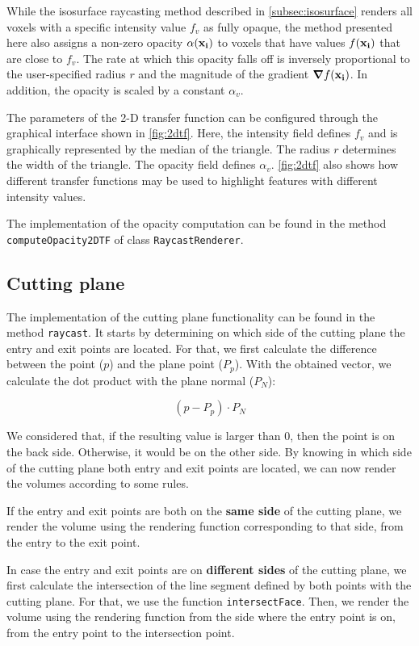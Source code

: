 \documentclass[a4paper]{article}
\begin{document}
While the isosurface raycasting method described in \autoref{subsec:isosurface} renders all voxels with a specific intensity value $f_v$ as fully opaque, the method presented here also assigns a non-zero opacity $\alpha(\vb{x_i})$ to voxels that have values $f(\vb{x_i})$ that are close to $f_v$. The rate at which this opacity falls off is inversely proportional to the user-specified radius $r$ and the magnitude of the gradient $\grad f(\vb{x_i})$. In addition, the opacity is scaled by a constant $\alpha_v$.

The parameters of the 2-D transfer function can be configured through the graphical interface shown in \autoref{fig:2dtf}. Here, the intensity field defines $f_v$ and is graphically represented by the median of the triangle. The radius $r$ determines the width of the triangle. The opacity field defines $\alpha_v$. \autoref{fig:2dtf} also shows how different transfer functions may be used to highlight features with different intensity values.

The implementation of the opacity computation can be found in the method {\tt computeOpacity2DTF} of class {\tt RaycastRenderer}.

\subsection{Cutting plane}

The implementation of the cutting plane functionality can be found in the method {\tt raycast}. It starts by determining on which side of the cutting plane the entry and exit points are located. For that, we first calculate the difference between the point ($p$) and the plane point ($P_p$). With the obtained vector, we calculate the dot product with the plane normal ($P_N$):

$$(p-P_p)\cdot P_N$$

We considered that, if the resulting value is larger than 0, then the point is on the back side. Otherwise, it would be on the other side. By knowing in which side of the cutting plane both entry and exit points are located, we can now render the volumes according to some rules.

If the entry and exit points are both on the \textbf{same side} of the cutting plane, we render the volume using the rendering function corresponding to that side, from the entry to the exit point.

In case the entry and exit points are on \textbf{different sides} of the cutting plane, we first calculate the intersection of the line segment defined by both points with the cutting plane. For that, we use the function {\tt intersectFace}. Then, we render the volume using the rendering function from the side where the entry point is on, from the entry point to the intersection point.
\end{document}
